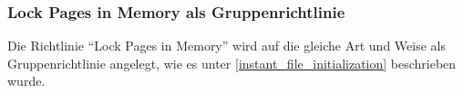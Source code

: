         \subsubsection{Lock Pages in Memory als Gruppenrichtlinie}
          Die Richtlinie \enquote{Lock Pages in Memory} wird auf die gleiche Art
          und Weise als Gruppenrichtlinie angelegt, wie es unter
          \ref{instant_file_initialization} beschrieben wurde.
        \begin{literaturinternet}
          \item \cite{ms190730}
        \end{literaturinternet}